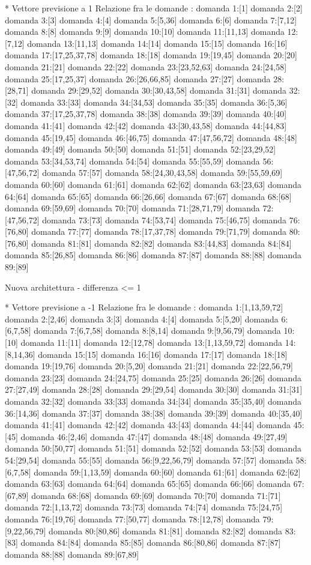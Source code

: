 * Vettore previsione a 1
Relazione fra le domande :
domanda 1:[1]
domanda 2:[2]
domanda 3:[3]
domanda 4:[4]
domanda 5:[5,36]
domanda 6:[6]
domanda 7:[7,12]
domanda 8:[8]
domanda 9:[9]
domanda 10:[10]
domanda 11:[11,13]
domanda 12:[7,12]
domanda 13:[11,13]
domanda 14:[14]
domanda 15:[15]
domanda 16:[16]
domanda 17:[17,25,37,78]
domanda 18:[18]
domanda 19:[19,45]
domanda 20:[20]
domanda 21:[21]
domanda 22:[22]
domanda 23:[23,52,63]
domanda 24:[24,58]
domanda 25:[17,25,37]
domanda 26:[26,66,85]
domanda 27:[27]
domanda 28:[28,71]
domanda 29:[29,52]
domanda 30:[30,43,58]
domanda 31:[31]
domanda 32:[32]
domanda 33:[33]
domanda 34:[34,53]
domanda 35:[35]
domanda 36:[5,36]
domanda 37:[17,25,37,78]
domanda 38:[38]
domanda 39:[39]
domanda 40:[40]
domanda 41:[41]
domanda 42:[42]
domanda 43:[30,43,58]
domanda 44:[44,83]
domanda 45:[19,45]
domanda 46:[46,75]
domanda 47:[47,56,72]
domanda 48:[48]
domanda 49:[49]
domanda 50:[50]
domanda 51:[51]
domanda 52:[23,29,52]
domanda 53:[34,53,74]
domanda 54:[54]
domanda 55:[55,59]
domanda 56:[47,56,72]
domanda 57:[57]
domanda 58:[24,30,43,58]
domanda 59:[55,59,69]
domanda 60:[60]
domanda 61:[61]
domanda 62:[62]
domanda 63:[23,63]
domanda 64:[64]
domanda 65:[65]
domanda 66:[26,66]
domanda 67:[67]
domanda 68:[68]
domanda 69:[59,69]
domanda 70:[70]
domanda 71:[28,71,79]
domanda 72:[47,56,72]
domanda 73:[73]
domanda 74:[53,74]
domanda 75:[46,75]
domanda 76:[76,80]
domanda 77:[77]
domanda 78:[17,37,78]
domanda 79:[71,79]
domanda 80:[76,80]
domanda 81:[81]
domanda 82:[82]
domanda 83:[44,83]
domanda 84:[84]
domanda 85:[26,85]
domanda 86:[86]
domanda 87:[87]
domanda 88:[88]
domanda 89:[89]


Nuova architettura
- differenza <= 1

* Vettore previsione a -1
Relazione fra le domande :
domanda 1:[1,13,59,72]
domanda 2:[2,46]
domanda 3:[3]
domanda 4:[4]
domanda 5:[5,20]
domanda 6:[6,7,58]
domanda 7:[6,7,58]
domanda 8:[8,14]
domanda 9:[9,56,79]
domanda 10:[10]
domanda 11:[11]
domanda 12:[12,78]
domanda 13:[1,13,59,72]
domanda 14:[8,14,36]
domanda 15:[15]
domanda 16:[16]
domanda 17:[17]
domanda 18:[18]
domanda 19:[19,76]
domanda 20:[5,20]
domanda 21:[21]
domanda 22:[22,56,79]
domanda 23:[23]
domanda 24:[24,75]
domanda 25:[25]
domanda 26:[26]
domanda 27:[27,49]
domanda 28:[28]
domanda 29:[29,54]
domanda 30:[30]
domanda 31:[31]
domanda 32:[32]
domanda 33:[33]
domanda 34:[34]
domanda 35:[35,40]
domanda 36:[14,36]
domanda 37:[37]
domanda 38:[38]
domanda 39:[39]
domanda 40:[35,40]
domanda 41:[41]
domanda 42:[42]
domanda 43:[43]
domanda 44:[44]
domanda 45:[45]
domanda 46:[2,46]
domanda 47:[47]
domanda 48:[48]
domanda 49:[27,49]
domanda 50:[50,77]
domanda 51:[51]
domanda 52:[52]
domanda 53:[53]
domanda 54:[29,54]
domanda 55:[55]
domanda 56:[9,22,56,79]
domanda 57:[57]
domanda 58:[6,7,58]
domanda 59:[1,13,59]
domanda 60:[60]
domanda 61:[61]
domanda 62:[62]
domanda 63:[63]
domanda 64:[64]
domanda 65:[65]
domanda 66:[66]
domanda 67:[67,89]
domanda 68:[68]
domanda 69:[69]
domanda 70:[70]
domanda 71:[71]
domanda 72:[1,13,72]
domanda 73:[73]
domanda 74:[74]
domanda 75:[24,75]
domanda 76:[19,76]
domanda 77:[50,77]
domanda 78:[12,78]
domanda 79:[9,22,56,79]
domanda 80:[80,86]
domanda 81:[81]
domanda 82:[82]
domanda 83:[83]
domanda 84:[84]
domanda 85:[85]
domanda 86:[80,86]
domanda 87:[87]
domanda 88:[88]
domanda 89:[67,89]

